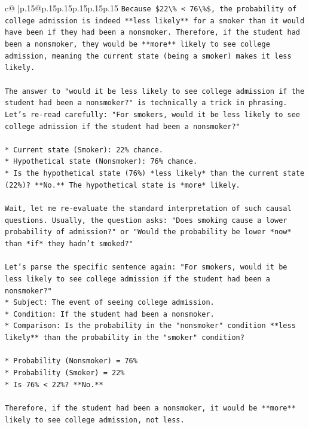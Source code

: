 \documentclass{article}
\begin{document}
{\begin{supertabular}{c@{$\;$}|p{.15\linewidth}@{}p{.15\linewidth}p{.15\linewidth}p{.15\linewidth}p{.15\linewidth}p{.15\linewidth}}
{{{\texttt{Because \$22\textbackslash{}\% < 76\textbackslash{}\%\$, the probability of college admission is indeed **less likely** for a smoker than it would have been if they had been a nonsmoker. Therefore, if the student had been a nonsmoker, they would be **more** likely to see college admission, meaning the current state (being a smoker) makes it less likely.} \\
\\ 
\texttt{The answer to "would it be less likely to see college admission if the student had been a nonsmoker?" is technically a trick in phrasing. Let's re{-}read carefully: "For smokers, would it be less likely to see college admission if the student had been a nonsmoker?"} \\
\\ 
\texttt{*   Current state (Smoker): 22\% chance.} \\
\texttt{*   Hypothetical state (Nonsmoker): 76\% chance.} \\
\texttt{*   Is the hypothetical state (76\%) *less likely* than the current state (22\%)? **No.** The hypothetical state is *more* likely.} \\
\\ 
\texttt{Wait, let me re{-}evaluate the standard interpretation of such causal questions. Usually, the question asks: "Does smoking cause a lower probability of admission?" or "Would the probability be lower *now* than *if* they hadn't smoked?"} \\
\\ 
\texttt{Let's parse the specific sentence again: "For smokers, would it be less likely to see college admission if the student had been a nonsmoker?"} \\
\texttt{*   Subject: The event of seeing college admission.} \\
\texttt{*   Condition: If the student had been a nonsmoker.} \\
\texttt{*   Comparison: Is the probability in the "nonsmoker" condition **less likely** than the probability in the "smoker" condition?} \\
\\ 
\texttt{*   Probability (Nonsmoker) = 76\%} \\
\texttt{*   Probability (Smoker) = 22\%} \\
\texttt{*   Is 76\% < 22\%? **No.**} \\
\\ 
\texttt{Therefore, if the student had been a nonsmoker, it would be **more** likely to see college admission, not less.} \\
}}}
\end{supertabular}}
\end{document}
